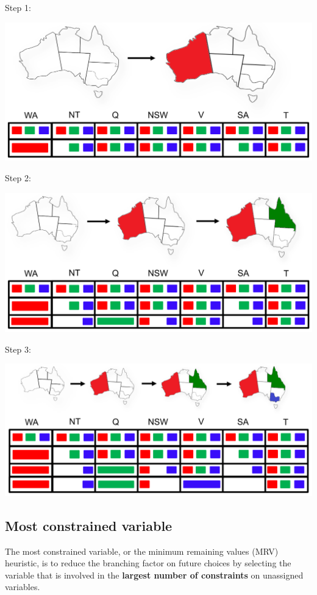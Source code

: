 \documentclass[11pt]{article}
\begin{document}
Step 1:
\begin{center}
\includegraphics[width=.9\linewidth]{./images/map-colouring-example-step-1.png}
\end{center}

Step 2:
\begin{center}
\includegraphics[width=.9\linewidth]{./images/map-colouring-example-step-2.png}
\end{center}

Step 3:
\begin{center}
\includegraphics[width=.9\linewidth]{./images/map-colouring-example-step-3.png}
\end{center}
\subsection{Most constrained variable}
\label{sec:org7dccfef}
The most constrained variable, or the minimum remaining values (MRV) heuristic, is to reduce the branching factor on future choices by selecting the variable that is involved in the \textbf{largest number of constraints} on unassigned variables.
\end{document}
